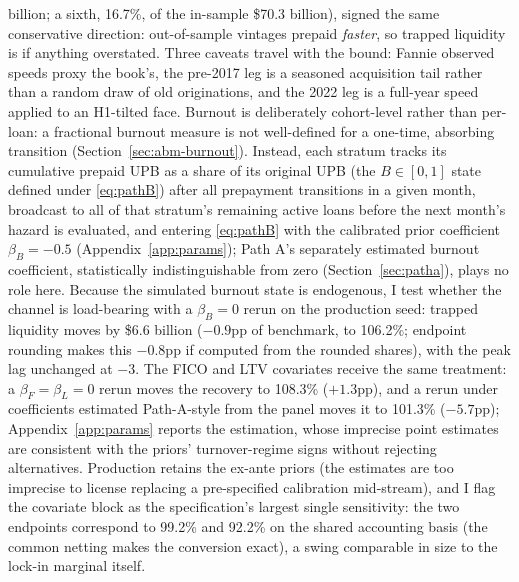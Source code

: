 \documentclass[12pt]{article}
\begin{document}
billion; a sixth, 16.7\%, of the in-sample \$70.3 billion), signed the same conservative direction: out-of-sample vintages prepaid \emph{faster}, so trapped liquidity is if anything overstated. Three caveats travel with the bound: Fannie observed speeds proxy the book's, the pre-2017 leg is a seasoned acquisition tail rather than a random draw of old originations, and the 2022 leg is a full-year speed applied to an H1-tilted face. Burnout is deliberately cohort-level rather than per-loan: a fractional burnout measure is not well-defined for a one-time, absorbing transition (Section~\ref{sec:abm-burnout}). Instead, each stratum tracks its cumulative prepaid UPB as a share of its original UPB (the $B \in [0,1]$ state defined under \eqref{eq:pathB}) after all prepayment transitions in a given month, broadcast to all of that stratum's remaining active loans before the next month's hazard is evaluated, and entering \eqref{eq:pathB} with the calibrated prior coefficient $\beta_B = -0.5$ (Appendix~\ref{app:params}); Path A's separately estimated burnout coefficient, statistically indistinguishable from zero (Section~\ref{sec:patha}), plays no role here. Because the simulated burnout state is endogenous, I test whether the channel is load-bearing with a $\beta_B = 0$ rerun on the production seed: trapped liquidity moves by \$6.6 billion ($-0.9$pp of benchmark, to 106.2\%; endpoint rounding makes this $-0.8$pp if computed from the rounded shares), with the peak lag unchanged at $-3$. The FICO and LTV covariates receive the same treatment: a $\beta_F = \beta_L = 0$ rerun moves the recovery to 108.3\% ($+1.3$pp), and a rerun under coefficients estimated Path-A-style from the panel moves it to 101.3\% ($-5.7$pp); Appendix~\ref{app:params} reports the estimation, whose imprecise point estimates are consistent with the priors' turnover-regime signs without rejecting alternatives. Production retains the ex-ante priors (the estimates are too imprecise to license replacing a pre-specified calibration mid-stream), and I flag the covariate block as the specification's largest single sensitivity: the two endpoints correspond to 99.2\% and 92.2\% on the shared accounting basis (the common netting makes the conversion exact), a swing comparable in size to the lock-in marginal itself.
\end{document}
